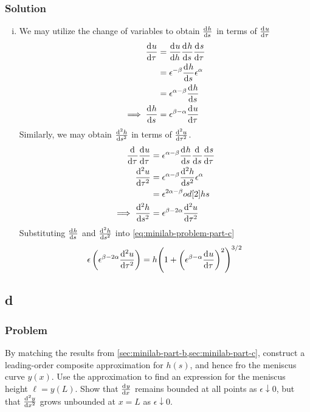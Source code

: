 \documentclass[12pt,twoside]{article}
\begin{document}
\subsubsection*{Solution}
\begin{enumerate}[(i)]
\item We may utilize the change of variables to obtain $\od{h}{s}$ in terms of
  $\od{u}{\tau}$
  \begin{equation*}
    \begin{aligned}
      \od{u}{\tau} &= \od{u}{h}\od{h}{s}\od{s}{\tau} \\
      &= \epsilon^{-\beta}\od{h}{s}\epsilon^{\alpha} \\
      &= \epsilon^{\alpha-\beta}\od{h}{s} \\
      \implies \od{h}{s} &= \epsilon^{\beta-\alpha}\od{u}{\tau} \\
    \end{aligned}
  \end{equation*}
  Similarly, we may obtain $\od[2]{h}{s}$ in terms of $\od[2]{u}{\tau}$.
  \begin{equation*}
    \begin{aligned}
      \od{}{\tau}\od{u}{\tau} &= \epsilon^{\alpha-\beta}\od{h}{s}\od{}{s}\od{s}{\tau} \\
      \od[2]{u}{\tau} &= \epsilon^{\alpha-\beta}\od[2]{h}{s}\epsilon^{\alpha} \\
      &= \epsilon^{2\alpha-\beta}od[2]{h}{s} \\
      \implies \od[2]{h}{s} &= \epsilon^{\beta-2\alpha}\od[2]{u}{\tau}
    \end{aligned}
  \end{equation*}
  Substituting $\od{h}{s}$ and $\od[2]{h}{s}$ into \cref{eq:minilab-problem-part-c}
  \begin{equation*}
    \epsilon\left(\epsilon^{\beta-2\alpha}\od[2]{u}{\tau}\right) =
    h{\left(1+{\left(\epsilon^{\beta-\alpha}\od{u}{\tau}\right)}^2\right)}^{3/2}
  \end{equation*}
\end{enumerate}

\subsection{d}
\label{sec:minilab-part-d}
\subsubsection*{Problem}
By matching the results from \cref{sec:minilab-part-b,sec:minilab-part-c},
construct a leading-order composite approximation for $h(s)$, and hence fro the
meniscus curve $y(x)$. Use the approximation to find an expression for the
meniscus height $\ell=y(L)$. Show that $\od{y}{x}$ remains bounded at all
points as $\epsilon\downarrow0$, but that $\od[2]{y}{x}$ grows unbounded at
$x=L$ as $\epsilon\downarrow0$.
\end{document}
